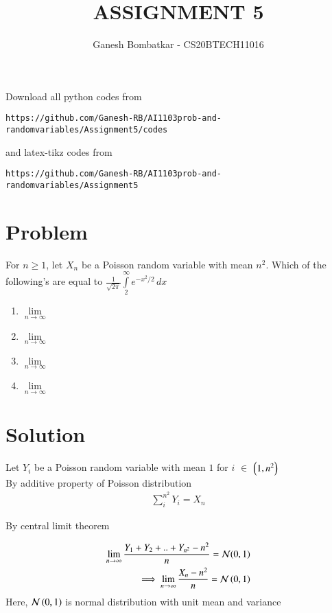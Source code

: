 \documentclass[journal,12pt,twocolumn]{IEEEtran}
\begin{document}
\title{ASSIGNMENT 5}
\author{Ganesh Bombatkar - CS20BTECH11016}
\maketitle
\newpage
\bigskip
\renewcommand{\thefigure}{\theenumi}
\renewcommand{\thetable}{\theenumi}
Download all python codes from 
\begin{lstlisting}
https://github.com/Ganesh-RB/AI1103prob-and-randomvariables/Assignment5/codes
\end{lstlisting}
%
and latex-tikz codes from 
%
\begin{lstlisting}
https://github.com/Ganesh-RB/AI1103prob-and-randomvariables/Assignment5
\end{lstlisting}
\section{Problem}
For $n \geq 1$, let $X_n$ be a Poisson random  variable with mean $n^2$.
 Which of the following's are equal to
 $\displaystyle{\frac{1}{\sqrt{2\pi}} \int \limits_2^{\infty} e^{-x^2/2}\,dx}$
\begin{enumerate}
    \item $\lim \limits_{n \to \infty} $ 
    \item $\lim \limits_{n \to \infty} $ 
    \item $\lim \limits_{n \to \infty} $ 
    \item $\lim \limits_{n \to \infty} $ 
\end{enumerate}


\section{Solution}
Let $Y_i$ be a Poisson random variable with mean $1$ for $i$ $\in$ $\left(1,n^2\right)$
\vspace{0.5cm}
\\By additive property of Poisson distribution
\begin{align}
   { \sum \limits_{i}^{n^2} Y_i = X_n   }  
\end{align}

By central limit theorem 

\begin{align}
    \lim  \limits_{n \to \infty} \frac{Y_1+Y_2+..+Y_{n^2} - n^2}{n} = \mathcal{N}(0,1)
    \\ \implies \lim  \limits_{n\to \infty} \frac{X_n-n^2}{n} = \mathcal{N}\left(0,1\right)
\end{align}
Here, $\mathcal{N}\left(0,1\right)$ is normal distribution with unit mean and variance
\end{document}
